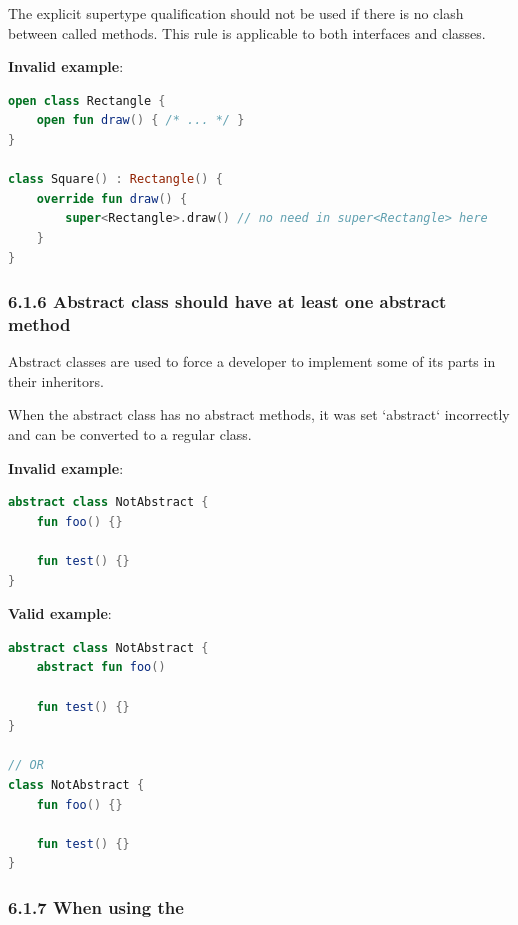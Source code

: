 {{{{\label{sec:6.1.5}

The explicit supertype qualification should not be used if there is no clash between called methods. This rule is applicable to both interfaces and classes.



\textbf{Invalid example}:

\begin{lstlisting}[language=Kotlin]
open class Rectangle {
    open fun draw() { /* ... */ }
}

class Square() : Rectangle() {
    override fun draw() {
        super<Rectangle>.draw() // no need in super<Rectangle> here
    }
}
\end{lstlisting}


\subsubsection*{\textbf{6.1.6 Abstract class should have at least one abstract method}}
\leavevmode\newline

\label{sec:6.1.6}

Abstract classes are used to force a developer to implement some of its parts in their inheritors.

When the abstract class has no abstract methods, it was set `abstract` incorrectly and can be converted to a regular class.



\textbf{Invalid example}:

\begin{lstlisting}[language=Kotlin]
abstract class NotAbstract {
    fun foo() {}
    
    fun test() {}
}
\end{lstlisting}


\textbf{Valid example}:

\begin{lstlisting}[language=Kotlin]
abstract class NotAbstract {
    abstract fun foo()
    
    fun test() {}
}

// OR
class NotAbstract {
    fun foo() {}
    
    fun test() {}
}
\end{lstlisting}




\subsubsection*{\textbf{6.1.7 When using the}}
\leavevmode\newline

}}}}
